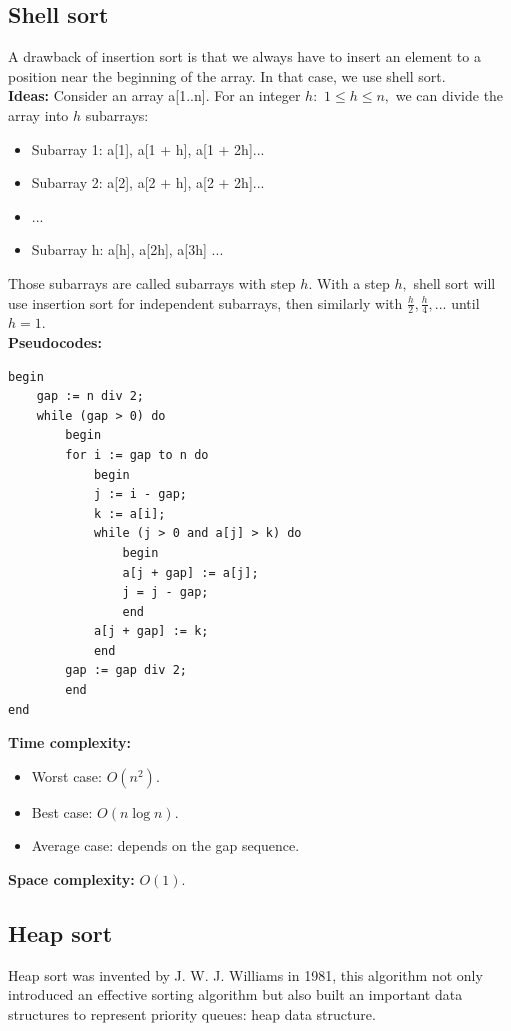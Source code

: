 \documentclass[12pt,a4paper]{article}
\begin{document}
\subsection{Shell sort}
\label{shellsort}
A drawback of insertion sort is that we always have to insert an element to a position near the beginning of the array. In that case, we use shell sort.\\
\textbf{Ideas:} Consider an array a[1..n]. For an integer $h:$ $1 \leqslant h \leqslant n,$ we can divide the array into $h$ subarrays:
\begin{itemize}
\item Subarray 1: a[1], a[1 + h], a[1 + 2h]...
\item Subarray 2: a[2], a[2 + h], a[2 + 2h]...
\item ...
\item Subarray h: a[h], a[2h], a[3h] ...
\end{itemize}
Those subarrays are called subarrays with step $h.$ With a step $h,$ shell sort will use insertion sort for independent subarrays, then similarly with $\frac{h}{2}, \frac{h}{4}, ...$ until $h = 1.$\\
\textbf{Pseudocodes:}
\lstset{language=Pascal} 
\begin{lstlisting}
begin
	gap := n div 2;
	while (gap > 0) do
		begin
		for i := gap to n do
			begin
			j := i - gap;
			k := a[i];
			while (j > 0 and a[j] > k) do
				begin
				a[j + gap] := a[j];
				j = j - gap;
				end
			a[j + gap] := k;
			end	
		gap := gap div 2;
		end
end
\end{lstlisting}
\textbf{Time complexity:} \cite{shell}
\begin{itemize}
\item Worst case: $O \left( {n^2} \right).$
\item Best case: $O \left( {n \log n} \right).$
\item Average case: depends on the gap sequence.
\end{itemize}
\textbf{Space complexity:} $O \left( {1} \right).$ \cite{shell}

\subsection{Heap sort}
Heap sort was invented by J. W. J. Williams in 1981, this algorithm not only introduced an effective sorting algorithm but also built an important data structures to represent priority queues: heap data structure.
\end{document}
